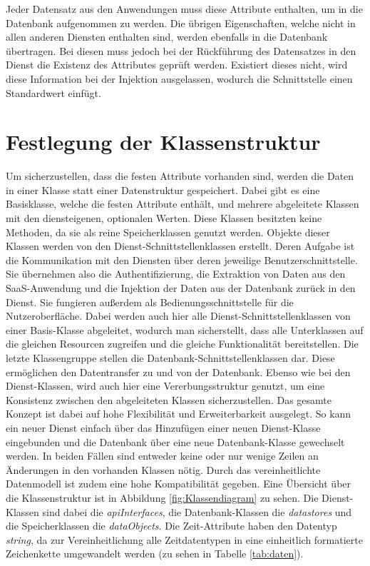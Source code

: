 Jeder Datensatz aus den Anwendungen muss diese Attribute enthalten, um in die Datenbank aufgenommen zu werden. Die übrigen Eigenschaften, welche nicht in allen anderen Diensten enthalten sind, werden ebenfalls in die Datenbank übertragen. Bei diesen muss jedoch bei der Rückführung des Datensatzes in den Dienst die Existenz des Attributes geprüft werden. Existiert dieses nicht, wird diese Information bei der Injektion ausgelassen, wodurch die Schnittstelle einen Standardwert einfügt.

\section{Festlegung der Klassenstruktur}

Um sicherzustellen, dass die festen Attribute vorhanden sind, werden die Daten in einer Klasse statt einer Datenstruktur gespeichert. Dabei gibt es eine Basisklasse, welche die festen Attribute enthält, und mehrere abgeleitete Klassen mit den diensteigenen, optionalen Werten. Diese Klassen besitzten keine Methoden, da sie als reine Speicherklassen genutzt werden. Objekte dieser Klassen werden von den Dienst-Schnittstellenklassen erstellt. Deren Aufgabe ist die Kommunikation mit den Diensten über deren jeweilige Benutzerschnittstelle. Sie übernehmen also die Authentifizierung, die Extraktion von Daten aus den SaaS-Anwendung und die Injektion der Daten aus der Datenbank zurück in den Dienst. Sie fungieren außerdem als Bedienungsschnittstelle für die Nutzeroberfläche. Dabei werden auch hier alle Dienst-Schnittstellenklassen von einer Basis-Klasse abgeleitet, wodurch man sicherstellt, dass alle Unterklassen auf die gleichen Resourcen zugreifen und die gleiche Funktionalität bereitstellen. Die letzte Klassengruppe stellen die Datenbank-Schnittstellenklassen dar. Diese ermöglichen den Datentransfer zu und von der Datenbank. Ebenso wie bei den Dienst-Klassen, wird auch hier eine Vererbungsstruktur genutzt, um eine Konsistenz zwischen den abgeleiteten Klassen sicherzustellen. Das gesamte Konzept ist dabei auf hohe Flexibilität und Erweiterbarkeit ausgelegt. So kann ein neuer Dienst einfach über das Hinzufügen einer neuen Dienst-Klasse eingebunden und die Datenbank über eine neue Datenbank-Klasse gewechselt werden. In beiden Fällen sind entweder keine oder nur wenige Zeilen an Änderungen in den vorhanden Klassen nötig. Durch das vereinheitlichte Datenmodell ist zudem eine hohe Kompatibilität gegeben. Eine Übersicht über die Klassenstruktur ist in Abbildung \ref{fig:Klassendiagram} zu sehen. Die Dienst-Klassen sind dabei die \textit{apiInterfaces}, die Datenbank-Klassen die \textit{datastores} und die Speicherklassen die \textit{dataObjects}. Die Zeit-Attribute haben den Datentyp \textit{string}, da zur Vereinheitlichung alle Zeitdatentypen in eine einheitlich formatierte Zeichenkette umgewandelt werden (zu sehen in Tabelle \ref{tab:daten}).\\


